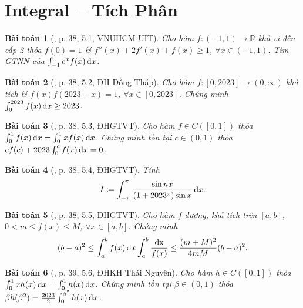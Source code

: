 \documentclass{article}
\newtheorem{baitoan}{Bài toán}
\begin{document}

\section{Integral -- Tích Phân}

\begin{baitoan}[\cite{VMS_VMC2023}, p. 38, 5.1, VNUHCM UIT]
	Cho hàm $f:(-1,1)\to\mathbb{R}$ khả vi đến cấp 2 thỏa $f(0) = 1$ \& $f''(x) + 2f'(x) + f(x)\ge1$, $\forall x\in(-1,1)$. Tìm {\rm GTNN} của $\int_{-1}^1 e^xf(x)\,{\rm d}x$.
\end{baitoan}

\begin{baitoan}[\cite{VMS_VMC2023}, p. 38, 5.2, ĐH Đồng Tháp]
	Cho hàm $f:[0,2023]\to(0,\infty)$ khả tích \& $f(x)f(2023 - x) = 1$, $\forall x\in[0,2023]$. Chứng minh $\int_0^{2023} f(x)\,{\rm d}x\ge2023$.
\end{baitoan}

\begin{baitoan}[\cite{VMS_VMC2023}, p. 38, 5.3, ĐHGTVT]
	Cho hàm $f\in C([0,1])$ thỏa $\int_0^1 f(x)\,{\rm d}x = \int_0^1 xf(x)\,{\rm d}x$. Chứng minh tồn tại $c\in(0,1)$ thỏa $cf(c) + 2023\int_0^c f(x)\,{\rm d}x = 0$.
\end{baitoan}

\begin{baitoan}[\cite{VMS_VMC2023}, p. 38, 5.4, ĐHGTVT]
	Tính
	\begin{equation*}
		I\coloneqq\int_{-\pi}^\pi \frac{\sin nx}{(1 + 2023^x)\sin x}\,{\rm d}x.
	\end{equation*}
\end{baitoan}

\begin{baitoan}[\cite{VMS_VMC2023}, p. 38, 5.5, ĐHGTVT]
	Cho hàm $f$ dương, khả tích trên $[a,b]$, $0 < m\le f(x)\le M$, $\forall x\in[a,b]$. Chứng minh
	\begin{equation*}
		(b - a)^2\le\int_a^b f(x)\,{\rm d}x\int_a^b \frac{{\rm dx}}{f(x)}\le\frac{(m + M)^2}{4mM}(b - a)^2.
	\end{equation*}
\end{baitoan}

\begin{baitoan}[\cite{VMS_VMC2023}, p. 39, 5.6, ĐHKH Thái Nguyên]
	Cho hàm $h\in C([0,1])$ thỏa $\int_0^1 xh(x)\,{\rm d}x = \int_0^1 h(x)\,{\rm d}x$. Chứng minh tồn tại $\beta\in(0,1)$ thỏa $\beta h(\beta^2) = \frac{2023}{2}\int_0^{\beta^2} h(x)\,{\rm d}x$.
\end{baitoan}
\end{document}
